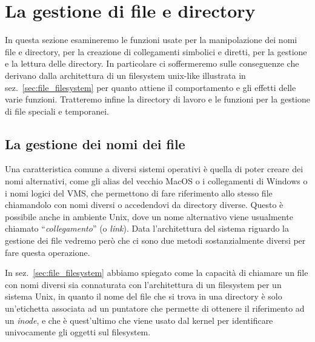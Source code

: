

\section{La gestione di file e directory}
\label{sec:file_dir}

In questa sezione esamineremo le funzioni usate per la manipolazione dei nomi
file e directory, per la creazione di collegamenti simbolici e diretti, per la
gestione e la lettura delle directory.  In particolare ci soffermeremo sulle
conseguenze che derivano dalla architettura di un filesystem unix-like
illustrata in sez.~\ref{sec:file_filesystem} per quanto attiene il
comportamento e gli effetti delle varie funzioni. Tratteremo infine la
directory di lavoro e le funzioni per la gestione di file speciali e
temporanei.


\subsection{La gestione dei nomi dei file}
\label{sec:link_symlink_rename}


Una caratteristica comune a diversi sistemi operativi è quella di poter creare
dei nomi alternativi, come gli alias del vecchio MacOS o i collegamenti di
Windows o i nomi logici del VMS, che permettono di fare riferimento allo
stesso file chiamandolo con nomi diversi o accedendovi da directory diverse.
Questo è possibile anche in ambiente Unix, dove un nome alternativo viene
usualmente chiamato ``\textsl{collegamento}'' (o \textit{link}).  Data
l'architettura del sistema riguardo la gestione dei file vedremo però che ci
sono due metodi sostanzialmente diversi per fare questa operazione.


In sez.~\ref{sec:file_filesystem} abbiamo spiegato come la capacità di
chiamare un file con nomi diversi sia connaturata con l'architettura di un
filesystem per un sistema Unix, in quanto il nome del file che si trova in una
directory è solo un'etichetta associata ad un puntatore che permette di
ottenere il riferimento ad un \textit{inode}, e che è quest'ultimo che viene
usato dal kernel per identificare univocamente gli oggetti sul filesystem.

